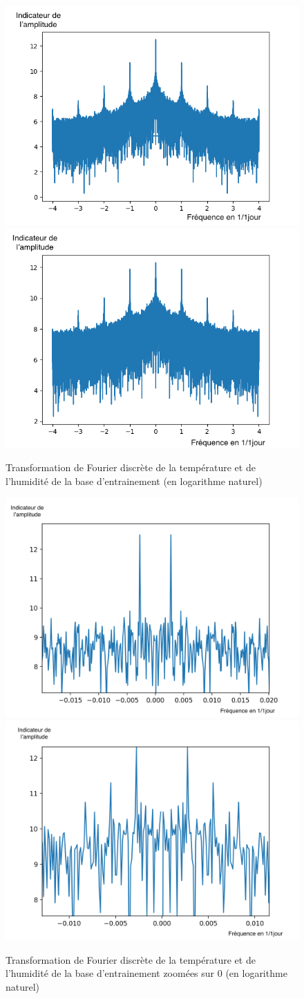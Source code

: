\documentclass[11pt,a4paper]{article}
\begin{document}
\begin{figure} [!h]
\centering
\includegraphics[width=0.48 \textwidth]{./imagesTIPE/fftT.png}\quad
\includegraphics[width=0.48 \textwidth]{./imagesTIPE/fftH.png}
\caption{\label{fig:ffta} Transformation de Fourier discrète de la température et de l'humidité de la base d'entrainement (en logarithme naturel)}
\end{figure}
\begin{figure} [!h]
\centering
\includegraphics[width=0.48 \textwidth]{./imagesTIPE/fftTZ.png}\quad
\includegraphics[width=0.48 \textwidth]{./imagesTIPE/fftHZ.png}
\caption{\label{fig:fftz} Transformation de Fourier discrète de la température et de l'humidité de la base d'entrainement zoomées sur 0 (en logarithme naturel) }
\end{figure}
\end{document}
